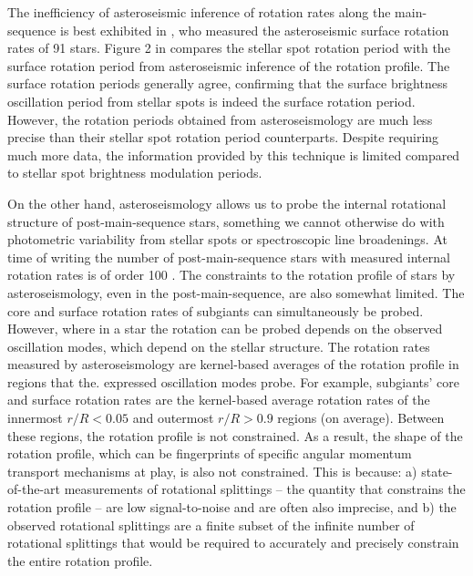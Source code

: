The inefficiency of asteroseismic inference of rotation rates along the main-sequence is best exhibited in \citet{hall_weakened_2021}, who measured the asteroseismic surface rotation rates of 91 stars.
Figure 2 in \citet{hall_weakened_2021} compares the stellar spot rotation period with the surface rotation period from asteroseismic inference of the rotation profile.
The surface rotation periods generally agree, confirming that the surface brightness oscillation period from stellar spots is indeed the surface rotation period.
However, the rotation periods obtained from asteroseismology are much less precise than their stellar spot rotation period counterparts.
Despite requiring much more data, the information provided by this technique is limited compared to stellar spot brightness modulation periods.

On the other hand, asteroseismology allows us to probe the internal rotational structure of post-main-sequence stars, something we cannot otherwise do with photometric variability from stellar spots or spectroscopic line broadenings.
At time of writing the number of post-main-sequence stars with measured internal rotation rates is of order 100 \citep[see, e.g.,][]{deheuvels_seismic_2014,gehan_measuring_2019,li_asteroseismology_2020,li_asteroseismology_2020-1,moyano_asteroseismology_2022}.
The constraints to the rotation profile of stars by asteroseismology, even in the post-main-sequence, are also somewhat limited.
The core and surface rotation rates of subgiants can simultaneously be probed.
However, where in a star the rotation can be probed depends on the observed oscillation modes, which depend on the stellar structure.
The rotation rates measured by asteroseismology are kernel-based averages of the rotation profile in regions that the. expressed oscillation modes probe.
For example, subgiants' core and surface rotation rates are the kernel-based average rotation rates of the innermost $r/R<0.05$ and outermost $r/R>0.9$ regions (on average).
Between these regions, the rotation profile is not constrained.
As a result, the shape of the rotation profile, which can be fingerprints of specific angular momentum transport mechanisms at play, is also not constrained.
This is because: a) state-of-the-art measurements of rotational splittings -- the quantity that constrains the rotation profile -- are low signal-to-noise and are often also imprecise, and b) the observed rotational splittings are a finite subset of the infinite number of rotational splittings that would be required to accurately and precisely constrain the entire rotation profile.

